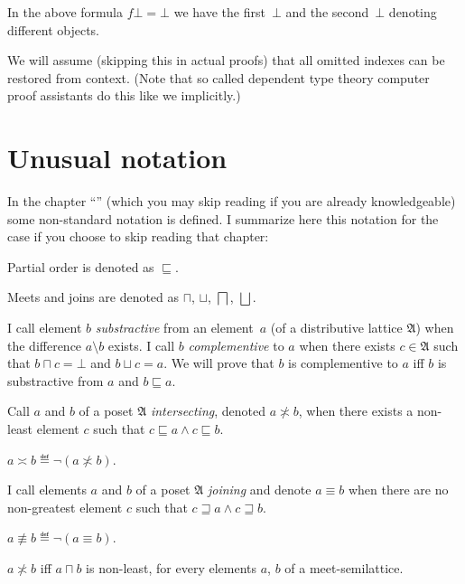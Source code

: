 \begin{note}
In the above formula $f\bot = \bot$ we have the first~$\bot$ and the second~$\bot$ denoting different objects.
\end{note}

We will assume (skipping this in actual proofs) that all omitted indexes can be restored from context.
(Note that so called dependent type theory computer proof assistants do this like we implicitly.)
\section{Unusual notation}

In the chapter ``'' (which you may skip reading
if you are already knowledgeable) some non-standard notation is defined.
I summarize here this notation for the case if you choose to skip
reading that chapter:

Partial order is denoted as $\sqsubseteq$.

Meets and joins are denoted as $\sqcap$, $\sqcup$, $\bigsqcap$,
$\bigsqcup$.

I call element $b$ \emph{substractive} from an element~$a$ (of a distributive
lattice $\mathfrak{A}$) when the difference $a\setminus b$ exists.
I call $b$ \emph{complementive} to $a$ when there exists $c\in\mathfrak{A}$
such that $b\sqcap c=\bot$ and $b\sqcup c=a$. We will prove that
$b$ is complementive to $a$ iff $b$ is substractive from $a$ and
$b\sqsubseteq a$.
\begin{defn}
Call $a$ and $b$ of a poset $\mathfrak{A}$ \emph{intersecting},
denoted $a\nasymp b$, when there exists a non-least element $c$
such that $c\sqsubseteq a\land c\sqsubseteq b$.
\end{defn}

\begin{defn}
$a\asymp b\eqdef\lnot(a\nasymp b)$.
\end{defn}

\begin{defn}
I call elements $a$ and $b$ of a poset $\mathfrak{A}$ \emph{joining}
and denote $a\equiv b$ when there are no non-greatest element $c$
such that $c\sqsupseteq a\land c\sqsupseteq b$.
\end{defn}

\begin{defn}
$a\nequiv b\eqdef\lnot(a\equiv b)$.\end{defn}
\begin{obvious}
$a\nasymp b$ iff $a\sqcap b$ is non-least, for every elements $a$,
$b$ of a meet-semilattice.
\end{obvious}

